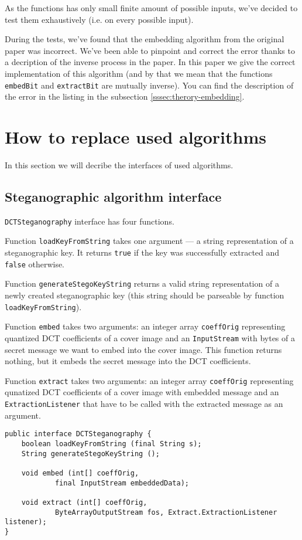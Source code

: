 As the functions has only small finite amount of possible inputs, we've decided
to test them exhaustively (i.e. on every possible input).

During the tests, we've found that the embedding algorithm from the original
paper \cite{liu2008high} was incorrect. We've been able to pinpoint and correct
the error thanks to a decription of the inverse process in the paper. In this 
paper we give the correct implementation of this algorithm (and by that we mean
that the functions \texttt{embedBit} and \texttt{extractBit} are mutually inverse).
You can find the description of the error in the listing in the subsection \ref{sssec:therory-embedding}.

\section{How to replace used algorithms}
In this section we will decribe the interfaces of used algorithms.

\subsection{Steganographic algorithm interface}
\texttt{DCTSteganography} interface has four functions.

Function \texttt{loadKeyFromString} takes one argument --- 
a string representation of a steganographic key. It returns
\texttt{true} if the key was successfully extracted and
\texttt{false} otherwise.

Function \texttt{generateStegoKeyString} returns a 
valid string representation of a newly created steganographic key 
(this string should be parseable by function \texttt{loadKeyFromString}).

Function \texttt{embed} takes two arguments: an integer array \texttt{coeffOrig}
representing quantized DCT coefficients of a cover image and an \texttt{InputStream} 
with bytes of a secret message we want to embed into the cover image. 
This function returns nothing, but it embeds the secret message into
the DCT coefficients. 

Function \texttt{extract} takes two arguments: an integer array \texttt{coeffOrig}
representing qunatized DCT coefficients of a cover image with embedded message
and an \texttt{ExtractionListener} that have to be called with the extracted message
as an argument.

\begin{lstlisting} 
public interface DCTSteganography {
    boolean loadKeyFromString (final String s);
    String generateStegoKeyString ();

    void embed (int[] coeffOrig, 
            final InputStream embeddedData);

    void extract (int[] coeffOrig,  
            ByteArrayOutputStream fos, Extract.ExtractionListener listener);
}
\end{lstlisting}

